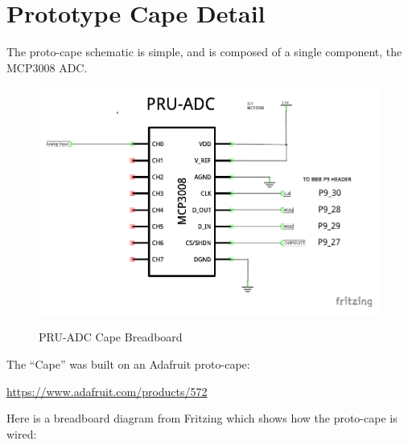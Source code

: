 %
%
%

\chapter{Prototype Cape Detail}




The proto-cape schematic is simple, and is composed of a single component, the MCP3008 ADC.

\begin{figure}[H]
	\centering
	\includegraphics{../../pcb/pru_adc_schematic_schem}
	\centering\bfseries
	\caption{PRU-ADC Cape Breadboard}
\end{figure}

The ``Cape'' was built on an Adafruit proto-cape:

\url{https://www.adafruit.com/products/572}

Here is a breadboard diagram from Fritzing which shows how the proto-cape
is wired:

